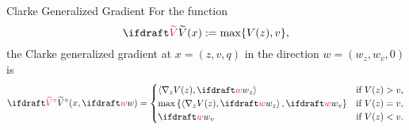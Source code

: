 \documentclass[notheorems, aspectratio=169, presentation]{beamer}
\begin{document}
\begin{frame}[t]{Clarke Generalized Gradient}
  For the function $$\tV(x) := \max\{V(z), v\},$$
  the Clarke generalized gradient at $x = (z, v, q)$ in the direction $w = (w_z, w_v, 0)$ is
  \begin{equation}
    \tVc(x, \flowdir)
    = \begin{cases}
                                \ip{\nabla_z V(z)}{\flowdir_z} & \textif V(z) > v, \\
        \max\setdef{\ip{\nabla_z V(z)}{\flowdir_z}, \flowdir_v} & \textif V(z) = v, \\
                                                    \flowdir_v & \textif V(z) < v.
    \end{cases}
  \end{equation}
\end{frame}
\end{document}
